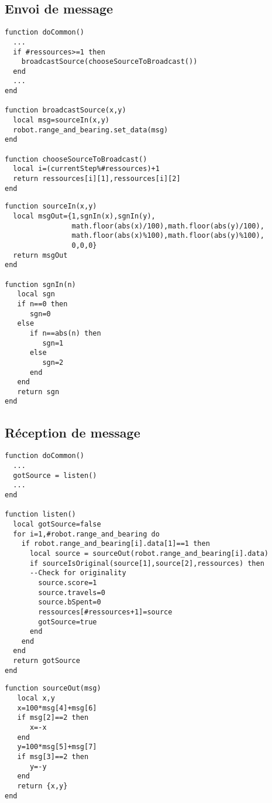 \begin{subappendices}
\subsection{Envoi de message}

\begin{lstlisting}[caption=Envoi d'un message différent à chaque pas]
function doCommon()
  ...
  if #ressources>=1 then
    broadcastSource(chooseSourceToBroadcast())
  end
  ...
end

function broadcastSource(x,y)
  local msg=sourceIn(x,y)
  robot.range_and_bearing.set_data(msg)
end

function chooseSourceToBroadcast()
  local i=(currentStep%#ressources)+1
  return ressources[i][1],ressources[i][2]
end
\end{lstlisting}

\begin{lstlisting}[caption=Encodage du message]
function sourceIn(x,y)
  local msgOut={1,sgnIn(x),sgnIn(y),
                math.floor(abs(x)/100),math.floor(abs(y)/100),
                math.floor(abs(x)%100),math.floor(abs(y)%100),
                0,0,0}
  return msgOut
end

function sgnIn(n)
   local sgn
   if n==0 then
      sgn=0
   else
      if n==abs(n) then
         sgn=1
      else
         sgn=2
      end
   end
   return sgn
end
\end{lstlisting}


\subsection{Réception de message}

\begin{lstlisting}[caption=Ecoute du capteur à chaque pas]
function doCommon()
  ...
  gotSource = listen()
  ...
end

function listen()
  local gotSource=false
  for i=1,#robot.range_and_bearing do
    if robot.range_and_bearing[i].data[1]==1 then
      local source = sourceOut(robot.range_and_bearing[i].data)
      if sourceIsOriginal(source[1],source[2],ressources) then
      --Check for originality
        source.score=1
        source.travels=0
        source.bSpent=0
        ressources[#ressources+1]=source
        gotSource=true
      end
    end
  end
  return gotSource
end
\end{lstlisting}

\begin{lstlisting}[caption=Décodage du message]
function sourceOut(msg)
   local x,y
   x=100*msg[4]+msg[6]
   if msg[2]==2 then
      x=-x
   end
   y=100*msg[5]+msg[7]
   if msg[3]==2 then
      y=-y
   end
   return {x,y}
end
\end{lstlisting}

\end{subappendices}
